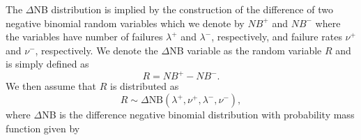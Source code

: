 \documentclass[12pt]{article}
\begin{document}
The $\Delta$NB distribution is implied by the construction of
the difference of two negative binomial random variables
which we denote by $ NB^{+}$ and $ NB^{-}$ where the variables
have number of failures $\lambda^{+}$ and $\lambda^{-}$, respectively,
and failure rates $\nu^{+}$ and $\nu^{-}$, respectively.
We denote the $\Delta$NB variable as the random variable
$R$ and is simply defined as
\begin{equation}
R=NB^{+}-NB^{-}.
\end{equation}
We then assume that $R$ is distributed as 
\begin{equation}
R \sim \textrm{$\Delta$NB}(\lambda^{+}, \nu^{+} ,\lambda^{-}, \nu^{-}) , 
\end{equation}
where $\Delta$NB is the difference negative binomial distribution 
with probability mass function given by
\end{document}
